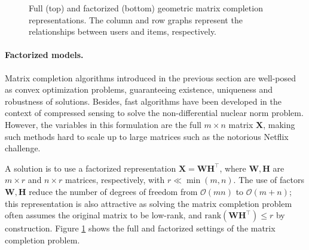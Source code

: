 \documentclass{article}
\begin{document}
 

\begin{figure}[h!]
\centering
{}
\caption{Full (top) and factorized (bottom) geometric matrix completion representations. 
The column and row graphs represent the relationships between users and items, respectively.  
 }
\label{fig:matrices}
\end{figure}	



\paragraph*{Factorized models. }
Matrix completion algorithms introduced in the previous section are well-posed as convex optimization problems, guaranteeing existence, uniqueness and robustness of solutions. Besides, fast algorithms have been developed in the context of compressed sensing to solve the non-differential nuclear norm problem. However, the variables in this formulation are the full  $m\times n$ matrix $\mathbf{X}$, making such methods hard to scale up to large matrices such as the notorious Netflix challenge. 

A solution is to use a factorized representation \cite{art:SrebroRennieJaakkola04MatFact,art:KorenBellVolinsky09MatFac,art:MaZhouLiuLyuKing11RecomSys,art:YanezBach14NMF,rao2015collaborative,art:BenziKalofoliasBressonVandergheynst16NMFTV} 
$\mathbf{X}=\mathbf{W}\mathbf{H}^\top$, 
where $\mathbf{W}, \mathbf{H}$ are $m\times r$ and $n\times r$ matrices, respectively, with $r\ll \min(m,n)$. The use of factors $\mathbf{W}, \mathbf{H}$ reduce the number of degrees of freedom from $\mathcal{O}(mn)$ to $\mathcal{O}(m+n)$; this representation is also attractive as solving the matrix completion problem often assumes the original matrix to be low-rank, and $\mathrm{rank}(\mathbf{W}\mathbf{H}^\top)\leq r$ by construction. 
Figure \ref{fig:matrices} shows the full and factorized settings of the matrix completion problem. 
\end{document}
